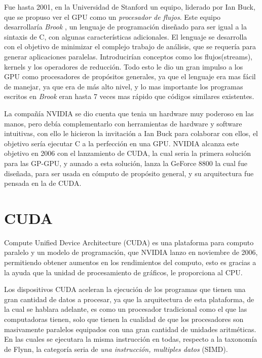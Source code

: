 Fue hasta 2001, en la Universidad de Stanford un equipo, liderado por Ian Buck, que se propuso ver el GPU como un  \textit{procesador de flujos}. Este equipo desarrollaría \textit{Brook} \cite{Buck2001}, un lenguaje de programación diseñado para ser igual a la sintaxis de C, con algunas características adicionales. El lenguaje se desarrolla con el objetivo de minimizar el complejo trabajo de análisis, que se requería para generar aplicaciones paralelas. Introducirían conceptos como los flujos(streams), kernels y los operadores de reducción. Todo esto le dio un gran impulso a los GPU como procesadores de propósitos generales, ya que el lenguaje era mas fácil de manejar, ya que era de más alto nivel, y lo mas importante los programas escritos en \textit{Brook} eran hasta 7 veces mas rápido que códigos similares existentes.

La compañía NVIDIA se dio cuenta que tenia un hardware muy poderoso en las manos, pero debía complementarlo con herramientas de hardware y software intuitivas, con ello le hicieron la invitación a Ian Buck para colaborar con ellos, el objetivo sería ejecutar C a la perfección en una GPU. NVIDIA alcanza este objetivo en 2006 con el lanzamiento de CUDA, la cual seria la primera solución para las GP-GPU, y aunado a esta solución, lanza la GeForce 8800 la cual fue diseñada, para ser usada en cómputo de propósito general, y su arquitectura fue pensada en la de CUDA. 

\section{CUDA}
Compute Unified Device Architecture (CUDA) es una plataforma para computo paralelo y un modelo de programación, que NVIDIA lanzo en noviembre de 2006, permitiendo obtener aumentos en los rendimientos del computo, esto es gracias a la ayuda que la unidad de procesamiento de gráficos, le proporciona al CPU. 

Los dispositivos CUDA aceleran la ejecución de los programas que tienen una gran cantidad de datos a procesar, ya que la arquitectura de esta plataforma, de la cual se hablara adelante, es como un procesador tradicional como el que las computadoras tienen, solo que tienen la cualidad de que los procesadores son masivamente paralelos equipados con una gran cantidad de unidades aritméticas. En las cuales se ejecutara la misma instrucción en todas, respecto a la taxonomía de Flynn, la categoría seria de \textit{una instrucción, multiples datos} (SIMD). 

